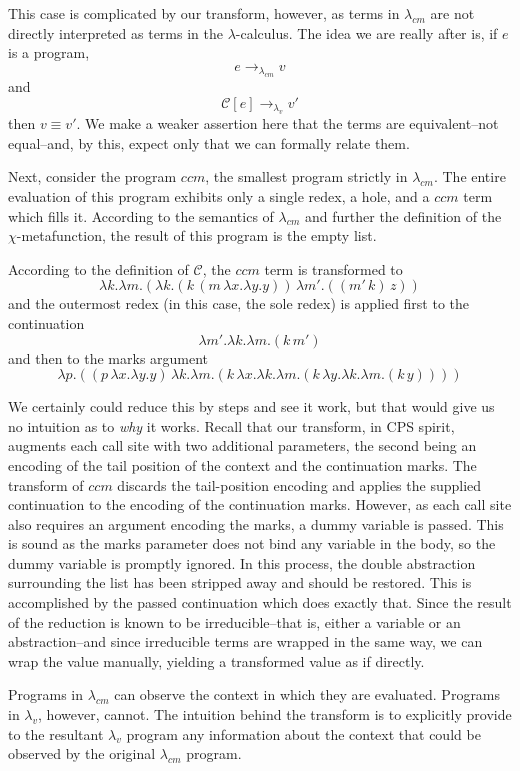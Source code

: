 \documentclass[ms,electronic,twosidetoc,letterpaper,chaptercenter,parttop]{byumsphd}
\begin{document}
This case is complicated by our transform, however, as terms in $\lambda_{cm}$ are not 
directly interpreted as terms in the $\lambda$-calculus. The idea we are really after is, 
if $e$ is a program,
\[
e\rightarrow_{\lambda_{cm}}v
\]
and
\[
\mathcal{C}[e]\rightarrow_{\lambda_{v}}v'
\]
then $v\equiv v'$. We make a weaker assertion here that the terms are equivalent--not 
equal--and, by this, expect only that we can formally relate them.

Next, consider the program $ccm$, the smallest program strictly in $\lambda_{cm}$. 
The entire evaluation of this program exhibits only a single redex, a hole, and a $ccm$ 
term which fills it. According to the semantics of $\lambda_{cm}$ and further the definition of the 
$\chi$-metafunction, the result of this program is the empty list.

According to the definition of $\mathcal{C}$, the $ccm$ term is transformed to
\[
\lambda k.\lambda m.(\lambda k.(k\,(m\,\lambda x.\lambda y.y))\,\lambda m'.((m'\,k)\,z))
\]
and the outermost redex (in this case, the sole redex) is applied first to the continuation
\[
\lambda m'.\lambda k.\lambda m.(k\,m')
\]
and then to the marks argument
\[
\lambda p.((p\,\lambda x.\lambda y.y)\,\lambda k.\lambda m.(k\,\lambda x.\lambda k.\lambda m.(k\,\lambda y.\lambda k.\lambda m.(k\,y))))
\]

We certainly could reduce this by steps and see it work, but that would give us no intuition as to \emph{why} it works. Recall that our transform, in CPS spirit, augments each call site with two additional parameters, the second being an encoding of the tail position of the context and the continuation marks. The transform of $ccm$ discards the tail-position encoding and applies the supplied continuation to the encoding of the continuation marks. However, as each call site also requires an argument encoding the marks, a dummy variable is passed. This is sound as the marks parameter does not bind any variable in the body, so the dummy variable is promptly ignored. In this process, the double abstraction surrounding the list has been stripped away and should be restored. This is accomplished by the passed continuation which does exactly that. Since the result of the reduction is known to be irreducible--that is, either a variable or an abstraction--and since irreducible terms are wrapped in the same way, we can wrap the value manually, yielding a transformed value as if directly.

Programs in $\lambda_{cm}$ can observe the context in which they are evaluated. Programs in $\lambda_v$, however, cannot. The intuition behind the transform is to explicitly provide to the resultant $\lambda_v$ program any information about the context that could be observed by the original $\lambda_{cm}$ program.
\end{document}

